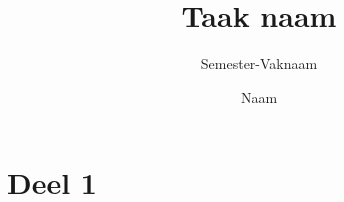 \documentclass[a4paper,openany]{uantwerpencoursetext}
\title{Taak naam}
\subtitle{Semester-Vaknaam}
\author{Naam}
\begin{document}
\maketitle


\chapter{Deel 1}
\end{document}
